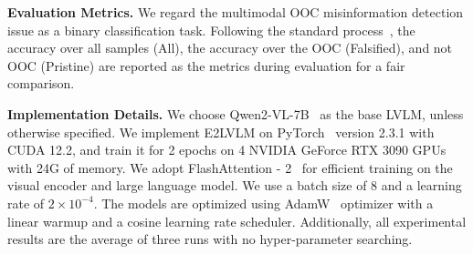 \noindent \textbf{Evaluation Metrics.} We regard the multimodal OOC misinformation detection issue as a binary classification task. Following the standard process~\cite{abdelnabi2022open}, the accuracy over all samples (All), the accuracy over the OOC (Falsified), and not OOC (Pristine) are reported as the metrics during evaluation for a fair comparison.

\noindent \textbf{Implementation Details.} We choose Qwen2-VL-7B~\cite{wang2024qwen2} as the base LVLM, unless otherwise specified. We implement E2LVLM on PyTorch~\cite{paszke2019pytorch} version 2.3.1 with CUDA 12.2, and train it for 2 epochs on 4 NVIDIA GeForce RTX 3090 GPUs with 24G of memory. We adopt FlashAttention - 2~\cite{dao2024flashattention} for efficient training on the visual encoder and large language model. We use a batch size of 8 and a learning rate of $2\times 10^{-4}$. The models are optimized using AdamW~\cite{loshchilov2017decoupled} optimizer with a linear warmup and a cosine learning rate scheduler. Additionally, all experimental results are the average of three runs with no hyper-parameter searching.




% 


% 
